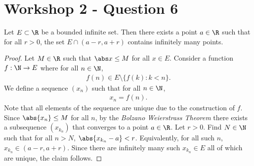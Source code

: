 \documentclass{article}
\begin{document}
\section{Workshop 2 - Question 6}

\begin{claim}
   Let $E\subset\R$ be a bounded infinite set.
   Then there exists a point $a\in\R$ such that for all $r>0$, the set
   $E\cap(a-r, a+r)$ contains infinitely many points.
\end{claim}
\begin{proof}
   Let $M\in\R$ such that $\abs x \leq M$ for all $x\in E$.
   Consider a function $f:\N\to E$ where for all $n\in\N$,
   \begin{align*}
      f(n) \in E \setminus \{f(k) : k < n\}.
   \end{align*}
   We define a sequence $(x_n)$ such that for all $n\in\N$,
   \begin{align*}
      x_n = f(n).
   \end{align*}
   Note that all elements of the sequence are unique due to the construction of $f$.
   Since $\abs{x_n}\leq M$ for all $n$, by the \emph{Bolzano Weierstrass Theorem} there exists a subsequence $(x_{k_n})$
   that converges to a point $a\in\R$. Let $r > 0$. Find $N\in\N$ such that for all $n>N$, $\abs{x_{k_n}-a}<r$. Equivalently,
   for all such $n$, $x_{k_n}\in(a-r, a+r)$. Since there are infinitely many such $x_{k_n}\in E$ all of which are unique,
   the claim follows.
\end{proof}
\end{document}
